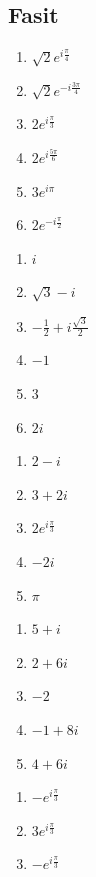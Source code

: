 \documentclass[a4paper,norsk,12pt]{article}
\begin{document}
\newpage
\begin{appendix}
\section{Fasit}
\begin{multicols}{3}
\begin{enumerate}[label=1\alph*)]
\item $\sqrt{2}e^{i\frac{\pi}{4}}$
\item $\sqrt{2}e^{-i\frac{3\pi}{4}}$
\item $2e^{i\frac{\pi}{3}}$
\item $2e^{i\frac{5\pi}{6}}$
\item $3e^{i\pi}$
\item $2e^{-i\frac{\pi}{2}}$
\end{enumerate}
\vspace{6pt}
\begin{enumerate}[label=2\alph*)]
\item $i$
\item $\sqrt{3} - i$
\item $-\frac12  + i\frac{\sqrt{3}}{2}$
\item $-1$
\item $3$
\item $2i$
\end{enumerate}
\vspace{6pt}
\begin{enumerate}[label=3\alph*)]
\item $2-i$
\item $3+2i$
\item $2e^{i\frac{\pi}{3}}$
\item $-2i$
\item $\pi$
\end{enumerate}
\vspace{6pt}
\begin{enumerate}[label=4\alph*)]
\item $5 + i$
\item $2 + 6i$
\item $-2$
\item $-1+8i$
\item $4 + 6i$
\end{enumerate}
\vspace{6pt}
\begin{enumerate}[label=5\alph*)]
\item $-e^{i\frac{\pi}{3}}$
\item $3e^{i\frac{\pi}{3}}$
\item $-e^{i\frac{\pi}{3}}$

\end{enumerate}
\end{multicols}
\end{appendix}
\end{document}
